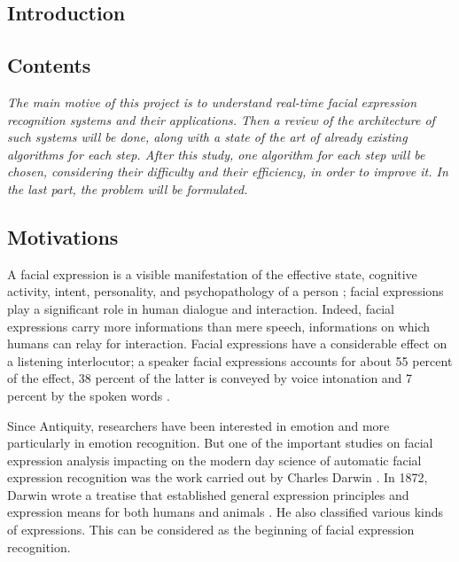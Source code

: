   \begin{titlepage}
    \vspace*{\fill}
      \part{Introduction}
    \vspace*{\fill}
  \end{titlepage}

\chapter*{Contents}

\textit{The main motive of this project is to understand real-time facial expression recognition systems and their applications. Then a review of the architecture of such systems will be done, along with a state of the art of already existing algorithms for each step. After this study, one algorithm for each step will be chosen, considering their difficulty and their efficiency, in order to improve it. In the last part, the problem will be formulated.}
\pagebreak

\chapter{Motivations}

A facial expression is a visible manifestation of the effective state, cognitive activity, intent, personality, and psychopathology of a person \cite{DON99}; facial expressions play a significant role in human dialogue and interaction. Indeed, facial expressions carry more informations than mere speech, informations on which humans can relay for interaction. Facial expressions have a considerable effect on a listening interlocutor; a speaker facial expressions accounts for about 55 percent of the effect, 38 percent of the latter is conveyed by voice intonation and 7 percent by the spoken words \cite{PAN00}.
\newline

\noindent Since Antiquity, researchers have been interested in emotion and more particularly in emotion recognition. But one of the important studies on facial expression analysis impacting on the modern day science of automatic facial expression recognition was the work carried out by Charles Darwin \cite{BET12}. In 1872, Darwin wrote a treatise that established general expression principles and expression means for both humans and animals \cite{DAR04}. He also classified various kinds of expressions. This can be considered as the beginning of facial expression recognition.
\newline

